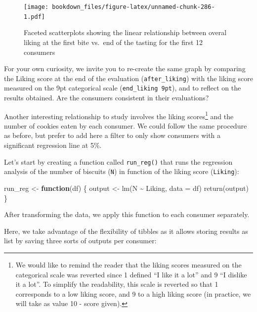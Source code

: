 \documentclass[
]{krantz}
\makeatletter
\newenvironment{Shaded}{\begin{snugshade}}{\end{snugshade}}
\newcommand{\AttributeTok}[1]{\textcolor[rgb]{0.61,0.61,0.61}{#1}}
\newcommand{\ControlFlowTok}[1]{\textcolor[rgb]{0.27,0.27,0.27}{\textbf{#1}}}
\newcommand{\FunctionTok}[1]{\textcolor[rgb]{0,0,0}{#1}}
\newcommand{\NormalTok}[1]{#1}
\newcommand{\OtherTok}[1]{\textcolor[rgb]{0.37,0.37,0.37}{#1}}
\newcommand{\SpecialCharTok}[1]{\textcolor[rgb]{0,0,0}{#1}}
\renewenvironment{quote}{\begin{VF}}{\end{VF}}
\newenvironment{kframe}{%
\medskip{}
\setlength{\fboxsep}{.8em}
 \def\at@end@of@kframe{}%
 \ifinner\ifhmode%
  \def\at@end@of@kframe{\end{minipage}}%
  \begin{minipage}{\columnwidth}%
 \fi\fi%
 \def\FrameCommand##1{\hskip\@totalleftmargin \hskip-\fboxsep
 \colorbox{shadecolor}{##1}\hskip-\fboxsep
     \hskip-\linewidth \hskip-\@totalleftmargin \hskip\columnwidth}%
 \MakeFramed {\advance\hsize-\width
   \@totalleftmargin\z@ \linewidth\hsize
   \@setminipage}}%
 {\par\unskip\endMakeFramed%
 \at@end@of@kframe}
\renewenvironment{Shaded}{\begin{kframe}}{\end{kframe}}
\makeatother
\begin{document}
\begin{figure}
\centering
\texttt{[image: bookdown\_files/figure-latex/unnamed-chunk-286-1.pdf]}
\caption{\label{fig:unnamed-chunk-286}Faceted scatterplots showing the linear relationship between overal liking at the first bite vs.~end of the tasting for the first 12 consumers}
\end{figure}

\begin{quote}
For your own curiosity, we invite you to re-create the same graph by comparing the Liking score at the end of the evaluation (\texttt{after\_liking}) with the liking score measured on the 9pt categorical scale (\texttt{end\_liking\ 9pt}), and to reflect on the results obtained. Are the consumers consistent in their evaluations?
\end{quote}

Another interesting relationship to study involves the liking scores\footnote{We would like to remind the reader that the liking scores measured on the categorical scale was reverted since 1 defined ``I like it a lot'' and 9 ``I dislike it a lot''. To simplify the readability, this scale is reverted so that 1 corresponds to a low liking score, and 9 to a high liking score (in practice, we will take as value 10 - score given).} and the number of cookies eaten by each consumer. We could follow the same procedure as before, but prefer to add here a filter to only show consumers with a significant regression line at 5\%.

Let's start by creating a function called \texttt{run\_reg()} that runs the regression analysis of the number of biscuits (\texttt{N}) in function of the liking score (\texttt{Liking}):

\begin{Shaded}
\begin{Highlighting}[]
\NormalTok{run\_reg }\OtherTok{\textless{}{-}} \ControlFlowTok{function}\NormalTok{(df) \{}
\NormalTok{  output }\OtherTok{\textless{}{-}} \FunctionTok{lm}\NormalTok{(N }\SpecialCharTok{\textasciitilde{}}\NormalTok{ Liking, }\AttributeTok{data =}\NormalTok{ df)}
  \FunctionTok{return}\NormalTok{(output)}
\NormalTok{\}}
\end{Highlighting}
\end{Shaded}

After transforming the data, we apply this function to each consumer separately.

Here, we take advantage of the flexibility of tibbles as it allows storing results as list by saving three sorts of outputs per consumer:
\end{document}
